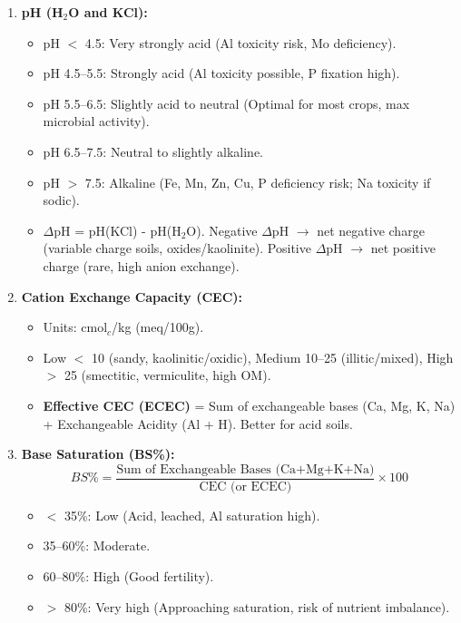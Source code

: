 \documentclass[11pt]{article}
\begin{document}
\begin{methode}
\begin{enumerate}
\item \textbf{pH (H$_2$O and KCl):} 
      \begin{itemize}
      \item pH $<$ 4.5: Very strongly acid (Al toxicity risk, Mo deficiency).
      \item pH 4.5--5.5: Strongly acid (Al toxicity possible, P fixation high).
      \item pH 5.5--6.5: Slightly acid to neutral (Optimal for most crops, max microbial activity).
      \item pH 6.5--7.5: Neutral to slightly alkaline.
      \item pH $>$ 7.5: Alkaline (Fe, Mn, Zn, Cu, P deficiency risk; Na toxicity if sodic).
      \item $\Delta$pH = pH(KCl) - pH(H$_2$O). Negative $\Delta$pH $\rightarrow$ net negative charge (variable charge soils, oxides/kaolinite). Positive $\Delta$pH $\rightarrow$ net positive charge (rare, high anion exchange).
      \end{itemize}
\item \textbf{Cation Exchange Capacity (CEC):} 
      \begin{itemize}
      \item Units: cmol$_c$/kg (meq/100g). 
      \item Low $<$ 10 (sandy, kaolinitic/oxidic), Medium 10--25 (illitic/mixed), High $>$ 25 (smectitic, vermiculite, high OM).
      \item \textbf{Effective CEC (ECEC)} = Sum of exchangeable bases (Ca, Mg, K, Na) + Exchangeable Acidity (Al + H). Better for acid soils.
      \end{itemize}
\item \textbf{Base Saturation (BS\%):} 
      \[
      BS\% = \frac{\text{Sum of Exchangeable Bases (Ca+Mg+K+Na)}}{\text{CEC (or ECEC)}} \times 100
      \]
      \begin{itemize}
      \item $<$ 35\%: Low (Acid, leached, Al saturation high).
      \item 35--60\%: Moderate.
      \item 60--80\%: High (Good fertility).
      \item $>$ 80\%: Very high (Approaching saturation, risk of nutrient imbalance).
      \end{itemize}

\end{enumerate}
\end{methode}
\end{document}
